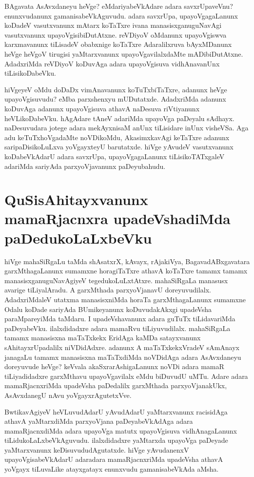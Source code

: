 BAgavata AsAvxdaneyu heVge? eMdariyabeVkAdare adara savxrUpaveVnu? enunxvudanunx gamanisabeVkAguvudu. adara savxrUpa, upayoVgagaLanunx koDadeV vasutxvanunx mAtarx koTaTxre ivana manasisxganuguNavAgi vasutxvanunx upayoVgisibiDutAtxne. reVDiyoV oMdanunx upayoVgiswva karxmavanunx tiLisadeV obabxnige koTaTxre Adaralilxruva bAyxMDanunx heVge heVgoV tirugisi yaMtarxvanunx upayoVgavilalxdaMte mADibiDutAtxne. AdadxriMda reVDiyoV koDuvAga adara upayoVgisuva vidhAnavanUnx tiLisikoDabeVku. 

hiVgeyeV oMdu doDaDx vimAnavanunx koTuTxbiTaTxre, adanunx heVge upayoVgisuvudu? eMba parxshenxyu mUDutatxde. AdadxriMda adanunx koDuvAga adanunx upayoVgisuva athavA naDesuva riVtiyanunx heVLikoDabeVku. hAgAdare tAneV adariMda upayoVga paDeyalu sAdhayx. naDesuvudara jotege adara mekAyxnisaM anUnx tiLisidare inUnx visheVSa. Aga adu keTuTxhoVgadaMte noVDikoMdu, AkasimxkavAgi keTaTxre adanunx saripaDisikoLuLxva yoVgayxteyU barutatxde. hiVge yAvudeV vasutxvanunx koDabeVkAdarU adara savxrUpa, upayoVgagaLanunx tiLisikoTATxgaleV adariMda sariyAda parxyoVjavanunx paDeyubahudu. 

\section*{QuSisAhitayxvanunx mamaRjacnxra upadeVshadiMda paDedukoLaLxbeVku}

hiVge mahaSiRgaLu taMda shAsatxrX, kAvayx, rAjakiVya, BagavadABxgavatara garxMthagaLanunx sumamxne horagiTaTxre athavA koTaTxre tamamx tamamx manasisxganuguNavAgiyeV tegedukoLuLxtAtxre. mahaSiRgaLa manasusx avarige tiLiyalAradu. A garxMthada parxyoVjanavU doreyuvudilalx. AdadxriMdaleV utatxma manasisxniMda horaTa garxMthagaLanunx sumamxne Odalu koDade sariyAda BUmikeyanunx koDuvudakAkxgi upadeVsha paraMpareyiMda taMdaru. I upadeVshavanunx adara guTuTx tiLidavariMda paDeyabeVku. ilalxdidadxre adara mamaRvu tiLiyuvudilalx. mahaSiRgaLa tamamx manasisxna maTaTxkekx EridAga kaMDa satayxvanunx sAhitayxrUpadalilx niVDidAdxre. adanunx A maTaTxkekxVradeV sAmAnayx janagaLu tamamx manasisxna maTaTxdiMda noVDidAga adara AsAvxdaneyu doreyuvude heVge? keVvala akaSxrarAshigaLanunx noVDi adara mamaR tiLiyadidadxre garxMthavu upayoVgavilalx eMdu biDuvudU uMTu. Adare adara mamaRjacnxriMda upadeVsha paDedalilx garxMthada parxyoVjanakUkx, AsAvxdanegU nAvu yoVgayxrAgutetxVve. 

BwtikavAgiyeV heVLuvudAdarU yAvudAdarU yaMtarxvanunx racisidAga athavA yaMtarxdiMda parxyoVjana paDeyabeVkAdAga adara mamaRjacnxdiMda adara upayoVga matutx upayoVgisuva vidhAnagaLanunx tiLidukoLaLxbeVkAguvudu. ilalxdidadxre yaMtarxda upayoVga paDeyade yaMtarxvanunx keDisuvududAgutatxde. hiVge yAvudanenxV upayoVgisabeVkAdarU adaradara mamaRjacnxriMda upadeVsha athavA yoVgayx tiLuvaLike atayxgatayx enunxvudu gamanisabeVkAda aMsha. 

